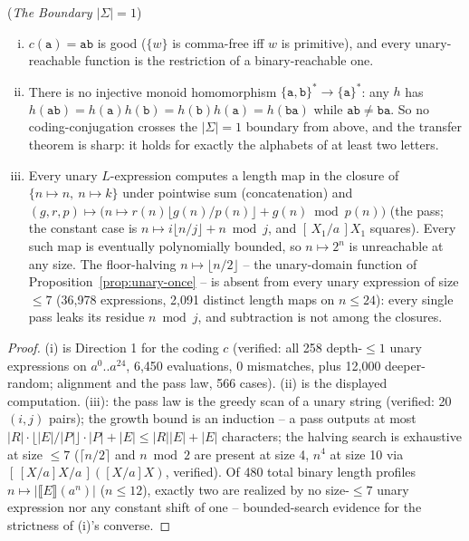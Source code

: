 \begin{proposition}
    (\emph{The Boundary $|\Sigma| = 1$})
    \label{prop:unary-edge}
    \begin{enumerate}[(i)]
        \item $c(\mathtt{a}) = \mathtt{ab}$ is good ($\{w\}$ is
        comma-free iff $w$ is primitive), and every unary-reachable
        function is the restriction of a binary-reachable one.
        \item There is no injective monoid homomorphism $\{\mathtt{a},
        \mathtt{b}\}^* \rightarrow \{\mathtt{a}\}^*$: any $h$ has
        $h(\mathtt{ab}) = h(\mathtt{a})h(\mathtt{b}) =
        h(\mathtt{b})h(\mathtt{a}) = h(\mathtt{ba})$ while $\mathtt{ab} \ne
        \mathtt{ba}$. So no coding-conjugation crosses the $|\Sigma| = 1$
        boundary from above, and the transfer theorem is sharp: it holds
        for exactly the alphabets of at least two letters.
        \item Every unary $L$-expression computes a length map in the
        closure of $\{n \mapsto n,\ n \mapsto k\}$ under pointwise sum
        (concatenation) and $(g,r,p) \mapsto \big(n \mapsto r(n)
        \lfloor g(n)/p(n) \rfloor + g(n) \bmod p(n)\big)$ (the pass; the
        constant case is $n \mapsto i\lfloor n/j \rfloor + n \bmod j$, and
        $[\,X_1/a\,]X_1$ squares). Every such map is eventually
        polynomially bounded, so $n \mapsto 2^n$ is unreachable at any
        size. The floor-halving $n \mapsto \lfloor n/2 \rfloor$ -- the
        unary-domain function of Proposition~\ref{prop:unary-once} -- is
        absent from every unary expression of size $\le 7$ (36,978
        expressions, 2,091 distinct length maps on $n \le 24$): every
        single pass leaks its residue $n \bmod j$, and subtraction is not
        among the closures.
    \end{enumerate}
\end{proposition}

\begin{proof}
    (i) is Direction 1 for the coding $c$ (verified: all 258 depth-$\le 1$
    unary expressions on $a^0..a^{24}$, 6,450 evaluations, 0 mismatches,
    plus 12,000 deeper-random; alignment and the pass law, 566 cases). (ii)
    is the displayed computation. (iii): the pass law is the greedy scan of
    a unary string (verified: 20 $(i,j)$ pairs); the growth bound is an
    induction -- a pass outputs at most $|R| \cdot \lfloor |E|/|P| \rfloor
    \cdot |P| + |E| \le |R||E| + |E|$ characters; the halving search is
    exhaustive at size $\le 7$ ($\lceil n/2 \rceil$ and $n \bmod 2$ are
    present at size 4, $n^4$ at size 10 via $[\,[X/a]X / a\,]([X/a]X)$,
    verified). Of 480 total binary length profiles $n \mapsto
    |\llbracket E \rrbracket(a^n)|$ ($n \le 12$), exactly two are realized
    by no size-$\le 7$ unary expression nor any constant shift of one --
    bounded-search evidence for the strictness of (i)'s converse.
\end{proof}

